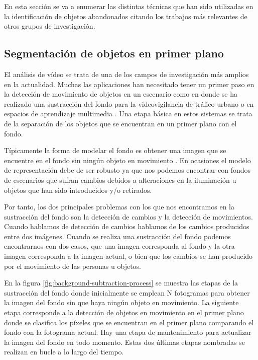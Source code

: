 En esta sección se va a enumerar las distintas técnicas que han sido utilizadas en la identificación de objetos abandonados citando los trabajos más relevantes de otros grupos de investigación.

\subsection{Segmentación de objetos en primer plano}
\label{subsec:tecnicas-segmentacion-obj-primer-plano}

El análisis de vídeo se trata de una de los campos de investigación más amplios en la actualidad. Muchas las aplicaciones han necesitado tener un primer paso en la detección de movimiento de objetos en un escenario como en \cite{cheung2005robust} donde se ha realizado una sustracción del fondo para la videovigilancia de tráfico urbano o en espacios de aprendizaje multimedia \cite{4381122}. Una etapa básica en estos sistemas se trata de la separación de los objetos que se encuentran en un primer plano con el fondo.

Típicamente la forma de modelar el fondo es obtener una imagen que se encuentre en el fondo sin ningún objeto en movimiento \cite{BOUWMANS201431}. En ocasiones el modelo de representación debe de ser robusto ya que nos podemos encontrar con fondos de escenarios que sufran cambios debidos a alteraciones en la iluminación u objetos que han sido introducidos y/o retirados.

Por tanto, los dos principales problemas con los que nos encontramos en la sustracción del fondo son la detección de cambios y la detección de movimientos. Cuando hablamos de detección de cambios hablamos de los cambios producidos entre dos imágenes. Cuando se realiza una sustracción del fondo podemos encontrarnos con dos casos, que una imagen corresponda al fondo y la otra imagen corresponda a la imagen actual, o bien que los cambios se han producido por el movimiento de las personas u objetos.

En la figura \ref{fig:background-subtraction-process} se muestra las etapas de la sustracción del fondo donde inicialmente se emplean N fotogramas para obtener la imagen del fondo sin que haya ningún objeto en movimiento. La siguiente etapa corresponde a la detección de objetos en movimiento en el primer plano donde se clasifica los píxeles que se encuentran en el primer plano comparando el fondo con la fotograma actual. Hay una etapa de mantenimiento para actualizar la imagen del fondo en todo momento. Estas dos últimas etapas nombradas se realizan en bucle a lo largo del tiempo.

